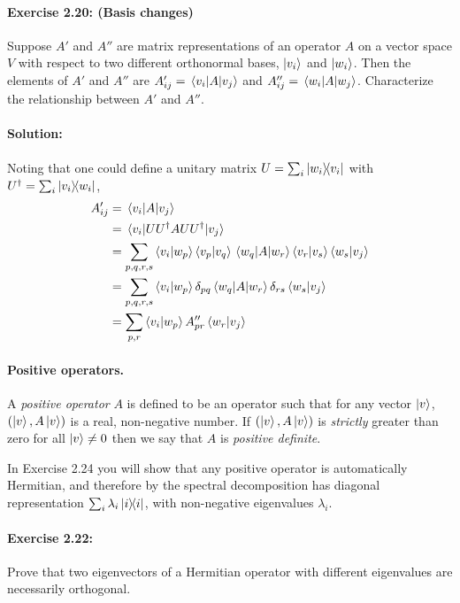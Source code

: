 \documentclass{article}
\begin{document}
\paragraph{\cite{mikeandike} Exercise 2.20: (Basis changes)} Suppose $A'$ and
$A''$ are matrix representations of an operator $A$ on a vector space $V$ with
respect to two different orthonormal bases, $\ket{v_i}$ and $\ket{w_i}$. Then
the elements of $A'$ and $A''$ are $A'_{ij} = \mel{v_i}{A}{v_j}$ and $A''_{ij}
= \mel{w_i}{A}{w_j}$. Characterize the relationship between $A'$ and $A''$.

\paragraph{Solution:} Noting that one could define a unitary matrix $U = \sum_i
\ketbra{w_i}{v_i}$ with $U^\dagger = \sum_i \ketbra{v_i}{w_i}$, \begin{align*}
  A'_{ij} &= \mel{v_i}{A}{v_j} \\
    &= \mel{v_i}{U U^\dagger A U U^\dagger}{v_j} \\
    &= \sum_{p,q,r,s} \braket{v_i}{w_p} \braket{v_p}{v_q} \mel{w_q}{A}{w_r}
      \braket{v_r}{v_s} \braket{w_s}{v_j} \\
    &= \sum_{p,q,r,s} \braket{v_i}{w_p} \delta_{pq} \mel{w_q}{A}{w_r}
      \delta_{rs} \braket{w_s}{v_j} \\
    &= \sum_{p,r} \braket{v_i}{w_p} A''_{pr} \braket{w_r}{v_j} \\
\end{align*}

\paragraph{Positive operators.} A \emph{positive operator} $A$ is defined to be
an operator such that for any vector $\ket{v}$, $(\ket{v}, A\ket{v})$ is a
real, non-negative number. If $(\ket{v}, A\ket{v})$ is \emph{strictly} greater
than zero for all $\ket{v} \neq 0$ then we say that $A$ is \emph{positive
definite}.

In Exercise 2.24 you will show that any positive operator is automatically
Hermitian, and therefore by the spectral decomposition has diagonal
representation $\sum_i \lambda_i \ketbra{i}{i}$, with non-negative eigenvalues
$\lambda_i$.

\paragraph{\cite{mikeandike} Exercise 2.22:} Prove that two eigenvectors of a
Hermitian operator with different eigenvalues are necessarily orthogonal.
\end{document}
